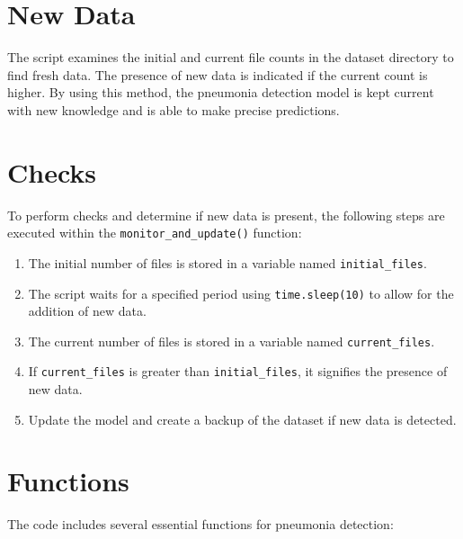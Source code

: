 	
\section{New Data}

The script examines the initial and current file counts in the dataset directory to find fresh data. The presence of new data is indicated if the current count is higher. By using this method, the pneumonia detection model is kept current with new knowledge and is able to make precise predictions.
	
\section{Checks}

To perform checks and determine if new data is present, the following steps are executed within the \texttt{monitor\_and\_update()} function:
	
\begin{enumerate}
	\item The initial number of files is stored in a variable named \texttt{initial\_files}.
	\item The script waits for a specified period using \texttt{time.sleep(10)} to allow for the addition of new data.
	\item The current number of files is stored in a variable named \texttt{current\_files}.
	\item If \texttt{current\_files} is greater than \texttt{initial\_files}, it signifies the presence of new data.
	\item Update the model and create a backup of the dataset if new data is detected.
\end{enumerate}

	
\section{Functions}

The code includes several essential functions for pneumonia detection:

